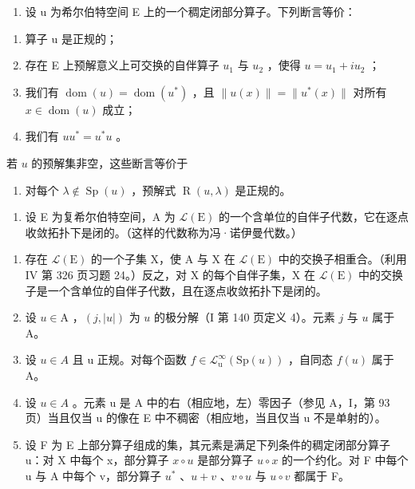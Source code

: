 \begin{enumerate}
\def\labelenumi{\arabic{enumi})}
\setcounter{enumi}{8}
\tightlist
\item
  设 u 为希尔伯特空间 E 上的一个稠定闭部分算子。下列断言等价：
\end{enumerate}

\begin{enumerate}
\def\labelenumi{\alph{enumi})}
\item
  算子 u 是正规的；
\item
  存在 E 上预解意义上可交换的自伴算子 \(u_{1}\) 与 \(u_{2}\) ，使得 \(u = u_{1} + iu_{2}\) ；
\item
  我们有 \(\operatorname{dom}(u) = \operatorname{dom}(u^*)\) ，且 \(\| u(x)\| = \| u^{*}(x)\|\) 对所有 \(x\in \operatorname{dom}(u)\) 成立；
\item
  我们有 \(uu^{*} = u^{*}u\) 。
\end{enumerate}

若 \(u\) 的预解集非空，这些断言等价于

\begin{enumerate}
\def\labelenumi{\alph{enumi})}
\setcounter{enumi}{4}
\tightlist
\item
  对每个 \(\lambda \notin \operatorname{Sp}(u)\) ，预解式 \(\operatorname{R}(u, \lambda)\) 是正规的。
\end{enumerate}

\begin{enumerate}
\def\labelenumi{\arabic{enumi})}
\setcounter{enumi}{9}
\tightlist
\item
  设 E 为复希尔伯特空间，A 为 \(\mathcal{L}(\mathrm{E})\) 的一个含单位的自伴子代数，它在逐点收敛拓扑下是闭的。（这样的代数称为冯·诺伊曼代数。）
\end{enumerate}

\begin{enumerate}
\def\labelenumi{\alph{enumi})}
\item
  存在 \(\mathcal{L}(\mathrm{E})\) 的一个子集 X，使 A 与 X 在 \(\mathcal{L}(\mathrm{E})\) 中的交换子相重合。（利用 IV 第 326 页习题 24。）反之，对 X 的每个自伴子集，X 在 \(\mathcal{L}(\mathrm{E})\) 中的交换子是一个含单位的自伴子代数，且在逐点收敛拓扑下是闭的。
\item
  设 \(u \in \mathrm{A}\) ，\((j, |u|)\) 为 \(u\) 的极分解（I 第 140 页定义 4）。元素 \(j\) 与 \(u\) 属于 A。
\item
  设 \(u \in A\) 且 u 正规。对每个函数 \(f \in \mathcal{L}_{\mathrm{u}}^{\infty}(\mathrm{Sp}(u))\) ，自同态 \(f(u)\) 属于 A。
\item
  设 \(u \in A\) 。元素 u 是 A 中的右（相应地，左）零因子（参见 A，I，第 93 页）当且仅当 u 的像在 E 中不稠密（相应地，当且仅当 u 不是单射的）。
\item
  设 F 为 E 上部分算子组成的集，其元素是满足下列条件的稠定闭部分算子 u：对 X 中每个 x，部分算子 \(x \circ u\) 是部分算子 \(u \circ x\) 的一个约化。对 F 中每个 u 与 A 中每个 v，部分算子 \(u^{*}\) 、\(u + v\) 、\(v \circ u\) 与 \(u \circ v\) 都属于 F。
\end{enumerate}

